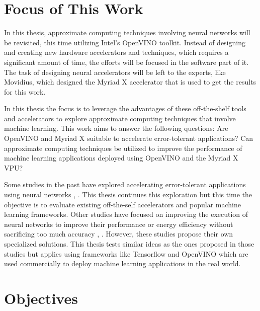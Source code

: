 \section{Focus of This Work}

In this thesis, approximate computing techniques involving neural networks will be revisited, this time utilizing Intel's OpenVINO toolkit. Instead of designing and creating new hardware accelerators and techniques, which requires a significant amount of time, the efforts will be focused in the software part of it. The task of designing neural accelerators will be left to the experts, like Movidius, which designed the Myriad X accelerator that is used to get the results for this work.


In this thesis the focus is to leverage the advantages of these off-the-shelf tools and accelerators to explore approximate computing techniques that involve machine learning. This work aims to answer the following questions: Are OpenVINO and Myriad X suitable to accelerate error-tolerant applications? Can approximate computing techniques be utilized to improve the performance of machine learning applications deployed using OpenVINO and the Myriad X VPU?

Some studies in the past have explored accelerating error-tolerant applications using neural networks \cite{Esmaeilzadeh2012}, \cite{Moreau2015a}. This thesis continues this exploration but this time the objective is to evaluate existing off-the-self accelerators and popular machine learning frameworks. Other studies have focused on improving the execution of neural networks to improve their performance or energy efficiency without sacrificing too much accuracy \cite{Hanif2018}, \cite{Sarwar2018}. However, these studies propose their own specialized solutions. This thesis tests similar ideas as the ones proposed in those studies but applies using frameworks like Tensorflow and OpenVINO which are used commercially to deploy machine learning applications in the real world.

\section{Objectives}

